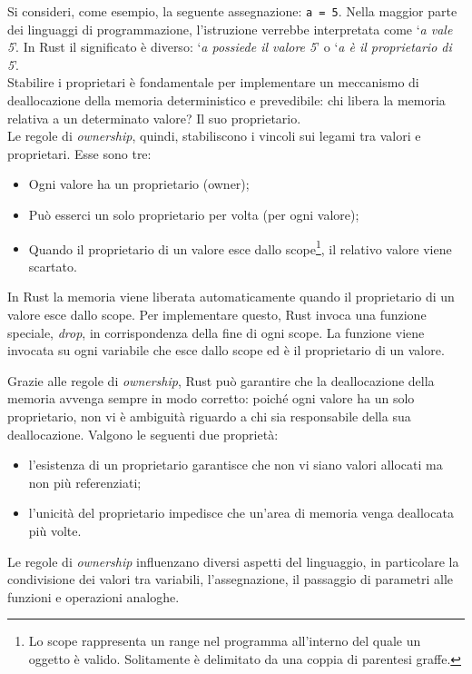 Si consideri, come esempio, la seguente assegnazione: \texttt{a = 5}.
Nella maggior parte dei linguaggi di programmazione, l'istruzione verrebbe interpretata come `\textit{a vale 5}'. In Rust il significato è diverso: `\textit{a possiede il valore 5}' o `\textit{a è il proprietario di 5}'. \\
\indent Stabilire i proprietari è fondamentale per implementare un meccanismo di deallocazione della memoria deterministico e prevedibile: chi libera la memoria relativa a un determinato valore? Il suo proprietario. \hfill
\vspace{5pt}\\
\noindent Le regole di \textit{ownership}, quindi, stabiliscono i vincoli sui legami tra valori e proprietari. Esse sono tre:
\begin{itemize}
    \item Ogni valore ha un proprietario (owner);
    \item Può esserci un solo proprietario per volta (per ogni valore);
    \item Quando il proprietario di un valore esce dallo scope\footnote{Lo scope rappresenta un range nel programma all'interno del quale un oggetto è valido. Solitamente è delimitato da una coppia di parentesi graffe.}, il relativo valore viene scartato.
\end{itemize}

\noindent In Rust la memoria viene liberata automaticamente quando il proprietario di un valore esce dallo scope. Per implementare questo, Rust invoca una funzione speciale, \textit{drop}, in corrispondenza della fine di ogni scope. La funzione viene invocata su ogni variabile che esce dallo scope ed è il proprietario di un valore.

Grazie alle regole di \textit{ownership}, Rust può garantire che la deallocazione della memoria avvenga sempre in modo corretto: poiché ogni valore ha un solo proprietario, non vi è ambiguità riguardo a chi sia responsabile della sua deallocazione. Valgono le seguenti due proprietà:
\begin{itemize}
    \item l'esistenza di un proprietario garantisce che non vi siano valori allocati ma non più referenziati;
    \item l'unicità del proprietario impedisce che un'area di memoria venga deallocata più volte.
\end{itemize}

\noindent Le regole di \textit{ownership} influenzano diversi aspetti del linguaggio, in particolare la condivisione dei valori tra variabili, l'assegnazione, il passaggio di parametri alle funzioni e operazioni analoghe.

